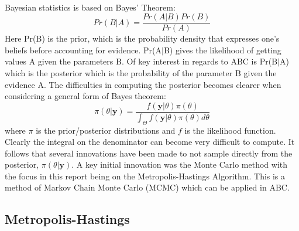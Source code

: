 \documentclass[12,fleqn]{article}
\theoremstyle{definition}
\theoremstyle{plain}
\begin{document}
\paragraph{}
Bayesian statistics is based on Bayes' Theorem:
\begin{equation*}
Pr(B|A) = \frac{Pr(A|B) Pr(B)}{Pr(A)}
\end{equation*}
Here Pr(B) is the prior, which is the probability density that expresses one's beliefs before accounting for evidence. Pr(A$|$B) gives the likelihood of getting values A given the parameters B. Of key interest in regards to ABC is Pr(B$|$A) which is the posterior which is the probability of the parameter B given the evidence A. The difficulties in computing the posterior becomes clearer when considering a general form of Bayes theorem:
\begin{equation*}
\pi(\theta|\boldsymbol{y}) = \frac{f(\boldsymbol{y}|\theta) \pi(\theta)}{\int_\Theta f(\boldsymbol{y} | \theta) \pi(\theta) d\theta}
\end{equation*}
where $\pi$ is the prior/posterior distributions and $f$ is the likelihood function. Clearly the integral on the denominator can become very difficult to compute. It follows that several innovations have been made to not sample directly from the posterior, $\pi(\theta|\boldsymbol{y})$. A key initial innovation was the Monte Carlo method with the focus in this report being on the Metropolis-Hastings Algorithm. This is a method of Markov Chain Monte Carlo (MCMC) which can be applied in ABC. 
\par


\subsection{Metropolis-Hastings}
\end{document}
